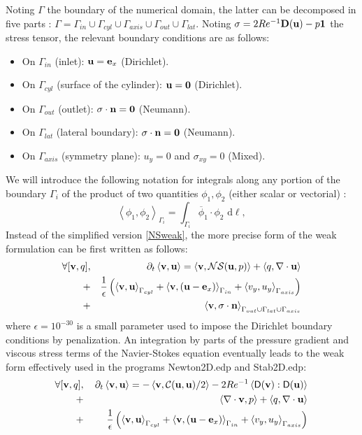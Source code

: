 \documentclass[twocolumn,10pt]{asme2ej}
\begin{document}
Noting $\Gamma$ the boundary of the numerical domain, the latter can be decomposed in five parts : 
$\Gamma = \Gamma_{in} \cup \Gamma_{cyl} \cup \Gamma_{axis} \cup \Gamma_{out} \cup \Gamma_{lat}$. 
Noting $\sigma = 2 Re^{-1} {\bf D}({\bf u}) - p {\bf 1}$ the stress tensor, the relevant boundary conditions are as follows:
\begin{itemize}
\item On $\Gamma_{in}$ (inlet): ${\bf u} = {\bf e}_x$ (Dirichlet).
\item On $\Gamma_{cyl}$ (surface of the cylinder): ${\bf u} = {\bf 0}$ (Dirichlet).
\item On $\Gamma_{out}$ (outlet): $\sigma \cdot {\bf n} = {\bf 0}$ (Neumann). 
\item On $\Gamma_{lat}$ (lateral boundary):  $\sigma \cdot {\bf n} = {\bf 0}$ (Neumann). 
\item On $\Gamma_{axis}$ (symmetry plane): $u_y = 0$ and $\sigma_{xy} = 0$ (Mixed). 
\end{itemize}
We will introduce the following notation for integrals along any portion of the boundary $\Gamma_i$ of the product of two quantities $\phi_1, \phi_2$ (either scalar or vectorial) :
$$
\left< \phi_1, \phi_2 \right>_{\Gamma_i} = \int_{\Gamma_i}  \overline{\phi}_1 \cdot \phi_2   \mbox{ d} \ell,
$$
Instead of the simplified version \ref{NSweak}, the more precise form of the weak formulation can be first written as follows:
\begin{eqnarray}
\label{NSweakFull}
\forall [{\bf v},q], &&\quad \partial_t \left< {\bf v}, {\bf u}\right> = \left< {\bf v} , {\cal NS} ({\bf u},p) \right> + \left< q, \nabla \cdot {\bf u}\right>\\
+ &&\frac{1}{\epsilon} \left(  \left< {\bf v}, \bf{u} \right>_{\Gamma_{cyl}} + \left< {\bf v}, ({\bf u}- {\bf e}_x ) \right>_{\Gamma_{in}} 
+ \left< v_y, u_y\right>_{\Gamma_{axis}} \right) \nonumber \\
+ && \left< {\bf v}, \sigma \cdot {\bf n} \right>_{\Gamma_{out} \cup  \Gamma_{lat} \cup \Gamma_{axis} }  \nonumber 
\end{eqnarray}
where $\epsilon=10^{-30}$ is a small parameter used to impose the Dirichlet boundary conditions by penalization.
An integration by parts of the pressure gradient and viscous stress terms of the Navier-Stokes equation eventually 
leads to the weak form effectively used in the programs {\sf Newton2D.edp} and {\sf Stab2D.edp}:
\begin{eqnarray}
\forall [{\bf v},q], &&\, \partial_t \left< {\bf v}, {\bf u}\right> = - \left< {\bf v} , {\cal C}({\bf u},{\bf u})/2 \right>
- 2 Re^{-1} \left< {\mathsf D}({\bf v}) : {\mathsf D}({\bf u})  \right>  \nonumber \\
+ &&\left< \nabla \cdot {\bf v}, p \right> + \left< q, \nabla \cdot {\bf u} \right> \label{NSweakFullN} \\
+ &&\frac{1}{\epsilon} \left(  \left< {\bf v}, \bf{u} \right>_{\Gamma_{cyl}} + \left< {\bf v}, ({\bf u}- {\bf e}_x ) \right>_{\Gamma_{in}} 
+ \left< v_y, u_y\right>_{\Gamma_{axis}} \right) \nonumber 
\end{eqnarray}
\end{document}
